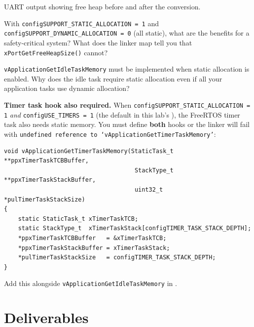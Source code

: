 \documentclass[11pt, a4paper]{article}
\begin{document}
\begin{checkpointbox}[~D]
  UART output showing free heap before and after the conversion.
\end{checkpointbox}

\begin{questionbox}[~D1]
  With \texttt{configSUPPORT\_STATIC\_ALLOCATION = 1} and
  \texttt{configSUPPORT\_DYNAMIC\_ALLOCATION = 0} (all static), what are the benefits
  for a safety-critical system? What does the linker map tell you that
  \texttt{xPortGetFreeHeapSize()} cannot?
\end{questionbox}

\begin{questionbox}[~D2]
  \texttt{vApplicationGetIdleTaskMemory} must be implemented when static allocation is
  enabled. Why does the idle task require static allocation even if all your application
  tasks use dynamic allocation?
\end{questionbox}

\begin{warnbox}
  \textbf{Timer task hook also required.}
  When \texttt{configSUPPORT\_STATIC\_ALLOCATION = 1} \emph{and}
  \texttt{configUSE\_TIMERS = 1} (the default in this lab's
  ), the FreeRTOS timer task also needs static memory.
  You must define \textbf{both} hooks or the linker will fail with
  \texttt{undefined reference to `vApplicationGetTimerTaskMemory'}:

\begin{lstlisting}[style=cstyle]
void vApplicationGetTimerTaskMemory(StaticTask_t **ppxTimerTaskTCBBuffer,
                                     StackType_t  **ppxTimerTaskStackBuffer,
                                     uint32_t      *pulTimerTaskStackSize)
{
    static StaticTask_t xTimerTaskTCB;
    static StackType_t  xTimerTaskStack[configTIMER_TASK_STACK_DEPTH];
    *ppxTimerTaskTCBBuffer   = &xTimerTaskTCB;
    *ppxTimerTaskStackBuffer = xTimerTaskStack;
    *pulTimerTaskStackSize   = configTIMER_TASK_STACK_DEPTH;
}
\end{lstlisting}

  Add this alongside \texttt{vApplicationGetIdleTaskMemory} in .
\end{warnbox}

\section{Deliverables}
\end{document}
